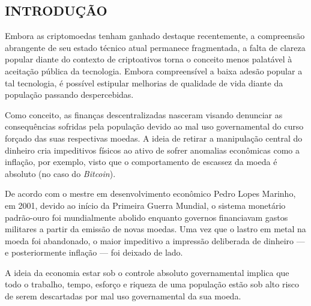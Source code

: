 \documentclass[article,12pt,oneside,a4paper,english,brazil]{unifil}
\begin{document}
\textual
\fontsize{12}{7}\selectfont
\begin{Spacing}{1.5}

% 

\section*{INTRODUÇÃO}


Embora as criptomoedas tenham ganhado destaque recentemente, a compreensão abrangente de seu estado técnico atual permanece fragmentada, a falta de clareza popular diante do contexto de criptoativos torna o conceito menos palatável à aceitação pública da tecnologia. Embora compreensível a baixa adesão popular a tal tecnologia, é possível estipular melhorias de qualidade de vida diante da população passando despercebidas.

Como conceito, as finanças descentralizadas nasceram visando denunciar as consequências sofridas pela população devido ao mal uso governamental do curso forçado das suas respectivas moedas. A ideia de retirar a manipulação central do dinheiro cria impeditivos físicos ao ativo de sofrer anomalias econômicas como a inflação, por exemplo, visto que o comportamento de escassez da moeda é absoluto (no caso do \textit{Bitcoin}).

De acordo com o mestre em desenvolvimento econômico Pedro Lopes Marinho, em 2001, devido ao início da Primeira Guerra Mundial, o sistema monetário padrão-ouro foi mundialmente abolido enquanto governos financiavam gastos militares a partir da emissão de novas moedas. Uma vez que o lastro em metal na moeda foi abandonado, o maior impeditivo a impressão deliberada de dinheiro — e posteriormente inflação — foi deixado de lado.

A ideia da economia estar sob o controle absoluto governamental implica que todo o trabalho, tempo, esforço e riqueza de uma população estão sob alto risco de serem descartadas por mal uso governamental da sua moeda.


\end{Spacing}
\end{document}
